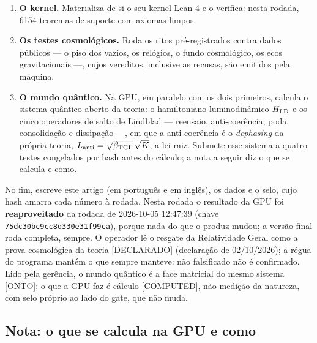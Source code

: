 \documentclass[11pt]{article}
\newcommand{\bTGL}{\beta_{\mathrm{TGL}}}\newcommand{\Msun}{M_{\odot}}\newcommand{\TGL}{\mathrm{TGL}}
\theoremstyle{definition}\newtheorem{deriv}{Derivação}
\begin{document}
\begin{enumerate}

\item \textbf{O kernel.} Materializa de si o seu kernel Lean 4 e o verifica: nesta rodada, 6154 teoremas de suporte com axiomas limpos.

\item \textbf{Os testes cosmológicos.} Roda os ritos pré-registrados contra dados públicos --- o piso dos vazios, os relógios, o fundo cosmológico, os ecos gravitacionais ---, cujos vereditos, inclusive as recusas, são emitidos pela máquina.

\item \textbf{O mundo quântico.} Na GPU, em paralelo com os dois primeiros, calcula o sistema quântico aberto da teoria: o hamiltoniano luminodinâmico $H_{\rm LD}$ e os cinco operadores de salto de Lindblad --- reensaio, anti-coerência, poda, consolidação e dissipação ---, em que a anti-coerência é o \emph{dephasing} da própria teoria, $L_{\rm anti}=\sqrt{\bTGL}\,\sqrt K$, a lei-raiz. Submete esse sistema a quatro testes congelados por hash antes do cálculo; a nota a seguir diz o que se calcula e como.

\end{enumerate}

No fim, escreve este artigo (em português e em inglês), os dados e o selo, cujo hash amarra cada número à rodada. Nesta rodada o resultado da GPU foi \textbf{reaproveitado} da rodada de 2026-10-05 12:47:39 (chave \texttt{75dc30bc9cc8d330e31f99ca}), porque nada do que o produz mudou; a versão final roda completa, sempre. O operador lê o resgate da Relatividade Geral como a prova cosmológica da teoria \textsf{[DECLARADO]} (declaração de 02/10/2026); a régua do programa mantém o que sempre manteve: não falsificado não é confirmado. Lido pela gerência, o mundo quântico é a face matricial do mesmo sistema \textsf{[ONTO]}; o que a GPU faz é cálculo \textsf{[COMPUTED]}, não medição da natureza, com selo próprio ao lado do gate, que não muda.

\subsection*{Nota: o que se calcula na GPU e como}

\end{document}
